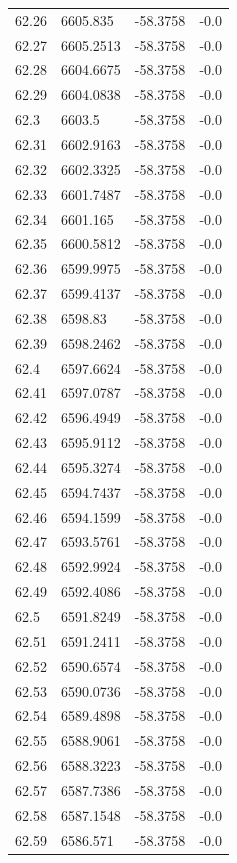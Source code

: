 \begin{table}[H]
\begin{tabular}{llll}
62.26 & 6605.835 & -58.3758 & -0.0 \\
62.27 & 6605.2513 & -58.3758 & -0.0 \\
62.28 & 6604.6675 & -58.3758 & -0.0 \\
62.29 & 6604.0838 & -58.3758 & -0.0 \\
62.3 & 6603.5 & -58.3758 & -0.0 \\
62.31 & 6602.9163 & -58.3758 & -0.0 \\
62.32 & 6602.3325 & -58.3758 & -0.0 \\
62.33 & 6601.7487 & -58.3758 & -0.0 \\
62.34 & 6601.165 & -58.3758 & -0.0 \\
62.35 & 6600.5812 & -58.3758 & -0.0 \\
62.36 & 6599.9975 & -58.3758 & -0.0 \\
62.37 & 6599.4137 & -58.3758 & -0.0 \\
62.38 & 6598.83 & -58.3758 & -0.0 \\
62.39 & 6598.2462 & -58.3758 & -0.0 \\
62.4 & 6597.6624 & -58.3758 & -0.0 \\
62.41 & 6597.0787 & -58.3758 & -0.0 \\
62.42 & 6596.4949 & -58.3758 & -0.0 \\
62.43 & 6595.9112 & -58.3758 & -0.0 \\
62.44 & 6595.3274 & -58.3758 & -0.0 \\
62.45 & 6594.7437 & -58.3758 & -0.0 \\
62.46 & 6594.1599 & -58.3758 & -0.0 \\
62.47 & 6593.5761 & -58.3758 & -0.0 \\
62.48 & 6592.9924 & -58.3758 & -0.0 \\
62.49 & 6592.4086 & -58.3758 & -0.0 \\
62.5 & 6591.8249 & -58.3758 & -0.0 \\
62.51 & 6591.2411 & -58.3758 & -0.0 \\
62.52 & 6590.6574 & -58.3758 & -0.0 \\
62.53 & 6590.0736 & -58.3758 & -0.0 \\
62.54 & 6589.4898 & -58.3758 & -0.0 \\
62.55 & 6588.9061 & -58.3758 & -0.0 \\
62.56 & 6588.3223 & -58.3758 & -0.0 \\
62.57 & 6587.7386 & -58.3758 & -0.0 \\
62.58 & 6587.1548 & -58.3758 & -0.0 \\
62.59 & 6586.571 & -58.3758 & -0.0 \\

\end{tabular}
\end{table}
